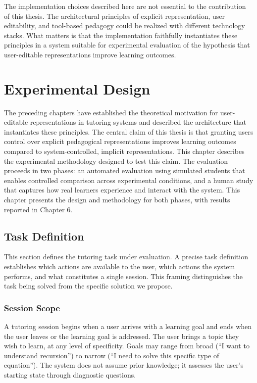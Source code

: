 \documentclass[logo,bsc,singlespacing,parskip,online]{infthesis}
\begin{document}
The implementation choices described here are not essential to the contribution of this thesis. The architectural principles of explicit representation, user editability, and tool-based pedagogy could be realized with different technology stacks. What matters is that the implementation faithfully instantiates these principles in a system suitable for experimental evaluation of the hypothesis that user-editable representations improve learning outcomes.

\chapter{Experimental Design}

The preceding chapters have established the theoretical motivation for user-editable representations in tutoring systems and described the architecture that instantiates these principles. The central claim of this thesis is that granting users control over explicit pedagogical representations improves learning outcomes compared to system-controlled, implicit representations. This chapter describes the experimental methodology designed to test this claim. The evaluation proceeds in two phases: an automated evaluation using simulated students that enables controlled comparison across experimental conditions, and a human study that captures how real learners experience and interact with the system. This chapter presents the design and methodology for both phases, with results reported in Chapter 6.

\section{Task Definition}

This section defines the tutoring task under evaluation. A precise task definition establishes which actions are available to the user, which actions the system performs, and what constitutes a single session. This framing distinguishes the task being solved from the specific solution we propose.

\subsection{Session Scope}

A tutoring session begins when a user arrives with a learning goal and ends when the user leaves or the learning goal is addressed. The user brings a topic they wish to learn, at any level of specificity. Goals may range from broad (``I want to understand recursion'') to narrow (``I need to solve this specific type of equation''). The system does not assume prior knowledge; it assesses the user's starting state through diagnostic questions.
\end{document}
